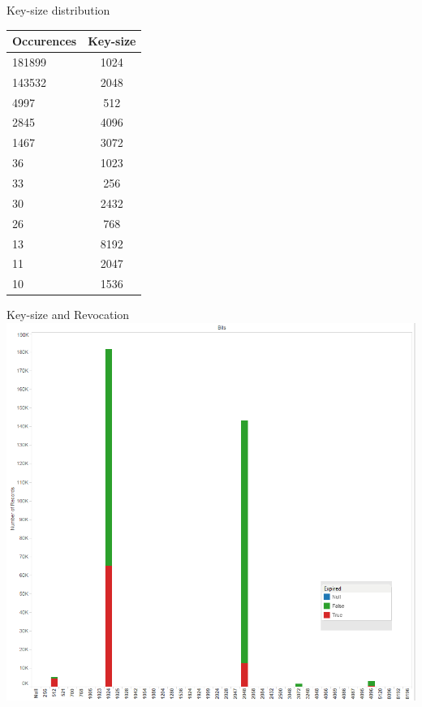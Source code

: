 \begin{frame}[t,fragile]{Key-size distribution}
        \begin{center}
        \begin{tabular}{ l | c}
          Occurences&Key-size\\ \hline
          181899&1024\\
         143532&2048\\
         4997&512\\
         2845&4096\\
        1467&3072\\
        36&1023\\
     33&256\\
     30&2432\\
     26&768\\
     13&8192\\
     11&2047\\
     10&1536\\
        \end{tabular}
\end{center}

\end{frame}

\begin{frame}[t,fragile]{Key-size and Revocation}
        \includegraphics[scale=0.23]{./images/expired.png}
\end{frame}

